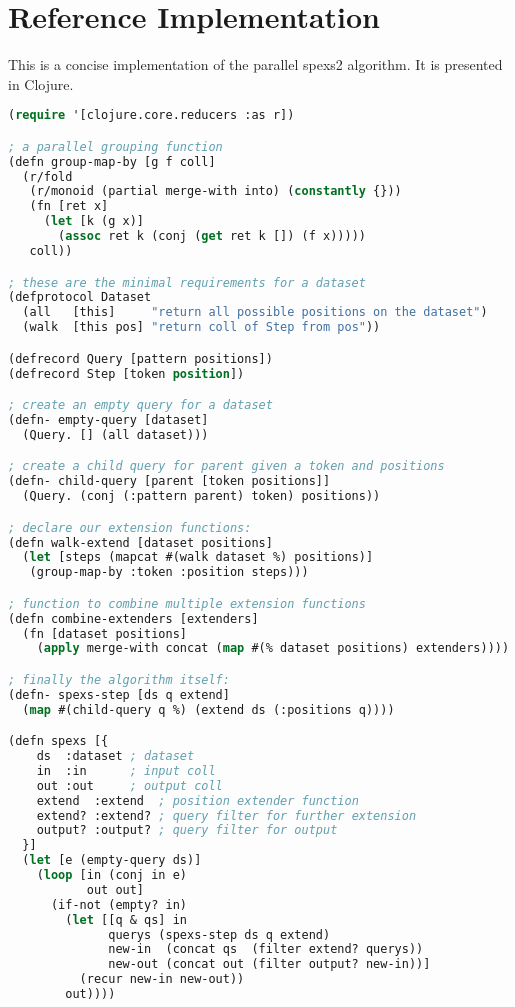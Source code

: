 \chapter{Reference Implementation}
\label{add:concise}

This is a concise implementation of the parallel spexs2 algorithm. It is presented in Clojure\cite{clojure}.

\begin{lstlisting}[language=Lisp]
(require '[clojure.core.reducers :as r])

; a parallel grouping function
(defn group-map-by [g f coll]
  (r/fold 
   (r/monoid (partial merge-with into) (constantly {}))
   (fn [ret x]
     (let [k (g x)]
       (assoc ret k (conj (get ret k []) (f x)))))
   coll))

; these are the minimal requirements for a dataset
(defprotocol Dataset
  (all   [this]     "return all possible positions on the dataset")
  (walk  [this pos] "return coll of Step from pos"))

(defrecord Query [pattern positions])
(defrecord Step [token position])

; create an empty query for a dataset
(defn- empty-query [dataset]
  (Query. [] (all dataset)))

; create a child query for parent given a token and positions
(defn- child-query [parent [token positions]]
  (Query. (conj (:pattern parent) token) positions))

; declare our extension functions:
(defn walk-extend [dataset positions]
  (let [steps (mapcat #(walk dataset %) positions)]
   (group-map-by :token :position steps)))

; function to combine multiple extension functions
(defn combine-extenders [extenders]
  (fn [dataset positions] 
    (apply merge-with concat (map #(% dataset positions) extenders))))

; finally the algorithm itself:
(defn- spexs-step [ds q extend]
  (map #(child-query q %) (extend ds (:positions q))))

(defn spexs [{
    ds  :dataset ; dataset
    in  :in      ; input coll
    out :out     ; output coll
    extend  :extend  ; position extender function
    extend? :extend? ; query filter for further extension
    output? :output? ; query filter for output
  }]
  (let [e (empty-query ds)]
    (loop [in (conj in e)
           out out]
      (if-not (empty? in)
        (let [[q & qs] in
              querys (spexs-step ds q extend)
              new-in  (concat qs  (filter extend? querys))
              new-out (concat out (filter output? new-in))]
          (recur new-in new-out))
        out))))


\end{lstlisting}
